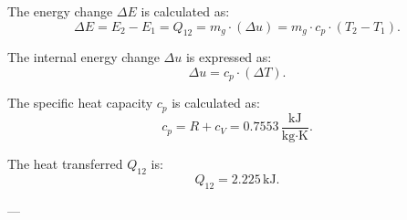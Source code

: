 The energy change \( \Delta E \) is calculated as:  
\[
\Delta E = E_2 - E_1 = Q_{12} = m_g \cdot (\Delta u) = m_g \cdot c_p \cdot (T_2 - T_1).
\]  

The internal energy change \( \Delta u \) is expressed as:  
\[
\Delta u = c_p \cdot (\Delta T).
\]  

The specific heat capacity \( c_p \) is calculated as:  
\[
c_p = R + c_V = 0.7553 \, \frac{\text{kJ}}{\text{kg·K}}.
\]  

The heat transferred \( Q_{12} \) is:  
\[
Q_{12} = 2.225 \, \text{kJ}.
\]  

---